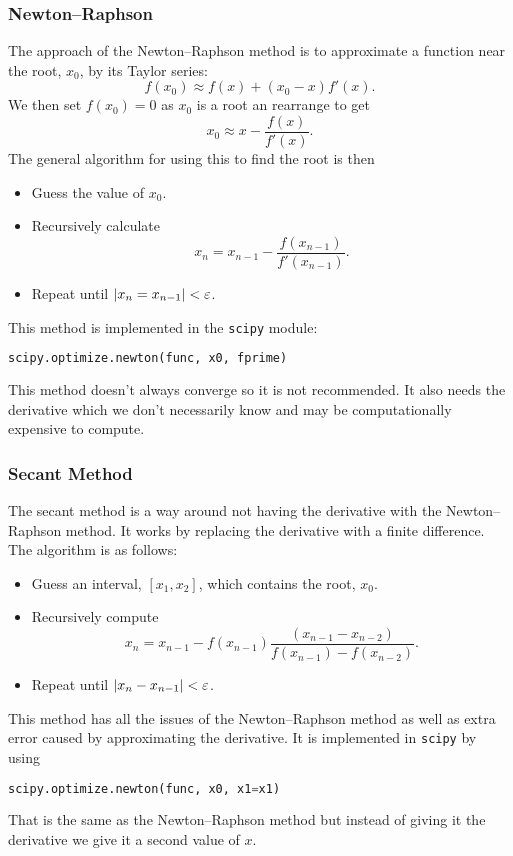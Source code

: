 \documentclass[a4paper]{article}
\begin{document}
    \subsubsection{Newton--Raphson}
    The approach of the Newton--Raphson method is to approximate a function near the root, \(x_0\), by its Taylor series:
    \[f(x_0) \approx f(x) + (x_0 - x)f'(x).\]
    We then set \(f(x_0) = 0\) as \(x_0\) is a root an rearrange to get
    \[x_0 \approx x - \frac{f(x)}{f'(x)}.\]
    The general algorithm for using this to find the root is then
    \begin{itemize}
        \item Guess the value of \(x_0\).
        \item Recursively calculate
        \[x_n = x_{n-1} - \frac{f(x_{n-1})}{f'(x_{n-1})}.\]
        \item Repeat until \(\abs{x_{n} = x_{n-1}} < \varepsilon\).
    \end{itemize}
    This method is implemented in the \lstinline[language=python]|scipy| module:
    \begin{lstlisting}[language=python]
    scipy.optimize.newton(func, x0, fprime)
    \end{lstlisting}
    This method doesn't always converge so it is not recommended.
    It also needs the derivative which we don't necessarily know and may be computationally expensive to compute.
    
    \subsubsection{Secant Method}
    The secant method is a way around not having the derivative with the Newton--Raphson method.
    It works by replacing the derivative with a finite difference.
    The algorithm is as follows:
    \begin{itemize}
        \item Guess an interval, \([x_1, x_2]\), which contains the root, \(x_0\).
        \item Recursively compute
        \[x_n = x_{n-1} - f(x_{n-1})\frac{(x_{n-1} - x_{n-2})}{f(x_{n-1}) - f(x_{n-2})}.\]
        \item Repeat until \(\abs{x_n - x_{n-1}}<\varepsilon\).
    \end{itemize}
    This method has all the issues of the Newton--Raphson method as well as extra error caused by approximating the derivative.
    It is implemented in \lstinline[language=python]|scipy| by using
    \begin{lstlisting}[language=python]
    scipy.optimize.newton(func, x0, x1=x1)
    \end{lstlisting}
    That is the same as the Newton--Raphson method but instead of giving it the derivative we give it a second value of \(x\).
    
\end{document}

